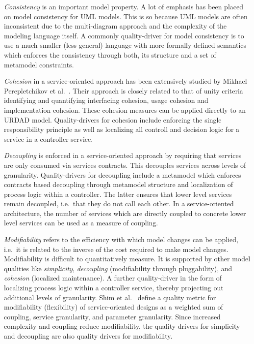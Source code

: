 \emph{Consistency} is an important model property. A lot of emphasis has been placed on model consistency for UML models. This is so because UML models are often inconsistent due to the multi-diagram approach and the complexity of the modeling language itself\cite{lange_empirical_2004}. A commonly quality-driver for model consistency is to use a much smaller (less general) language with more formally defined semantics which enforces the consistency through both, its structure and a set of metamodel constraints.

\emph{Cohesion} in a service-oriented approach has been extensively studied by Mikhael Perepletchikov et al.\ \cite{perepletchikov_cohesion_2007,perepletchikov_impact_2010}. Their approach is closely related to that of unity criteria \cite{gonzalez_unity_2009} identifying and quantifying interfacing cohesion, usage cohesion and implementation cohesion. These cohesion measures can be applied directly to an URDAD model. Quality-drivers for cohesion include enforcing the single responsibility principle as well as localizing all controll and decision logic for a service in a controller service. 

\emph{Decoupling} is enforced in a service-oriented approach by requiring that services are only consumed via services contracts. This decouples services across levels of granularity. Quality-drivers for decoupling include a metamodel which enforces contracts based decoupling through metamodel structure and localization of process logic within a controller. The latter ensures that lower level services remain decoupled, i.e.\ that they do not call each other. In a service-oriented architecture, the number of services which are directly coupled to concrete lower level services can be used as a measure of coupling\cite{shim_design_2008}.

\emph{Modifiability} refers to the efficiency with which model changes can be applied, i.e.\ it is related to the inverse of the cost required to make model changes. Modifiability is difficult to quantitatively measure. It is supported by other model qualities like \emph{simplicity},  \emph{decoupling} (modifiability through pluggability), and \emph{cohesion} (localized maintenance). A further quality-driver in the form of localizing process logic within a controller service, thereby projecting out additional levels of granularity. Shim et al.\ \cite{shim_design_2008} define a quality metric for modifiability (flexibility) of service-oriented designs as a weighted sum of coupling, service granularity, and parameter granularity. Since increased complexity and coupling reduce modifiability, the quality drivers for simplicity and decoupling are also quality drivers for modifiability.


